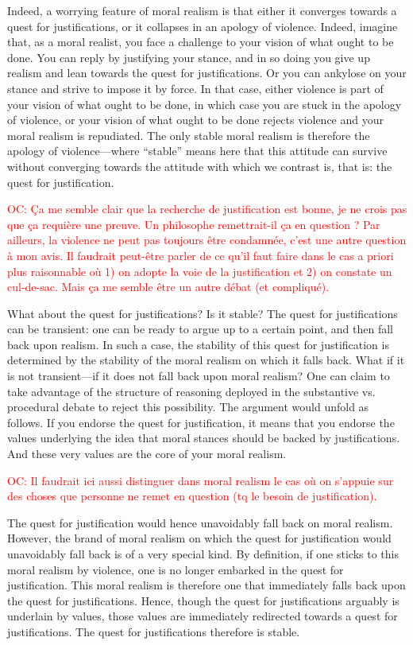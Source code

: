 \documentclass[preprint,11pt]{elsarticle}
\newcommand{\commentOC}[1]{\textcolor{red}{OC: #1}}
\begin{document}
Indeed, a worrying feature of moral realism is that either it converges towards a quest for justifications, or it collapses in an apology of violence. Indeed, imagine that, as a moral realist, you face a challenge to your vision of what ought to be done. You can reply by justifying your stance, and in so doing you give up realism and lean towards the quest for justifications. Or you can ankylose on your stance and strive to impose it by force. In that case, either violence is part of your vision of what ought to be done, in which case you are stuck in the apology of violence, or your vision of what ought to be done rejects violence and your moral realism is repudiated. The only stable moral realism is therefore the apology of violence—where “stable” means here that this attitude can survive without converging towards the attitude with which we contrast is, that is: the quest for justification.

\commentOC{ Ça me semble clair que la
recherche de justification est bonne, je ne crois pas que ça
requière une preuve. Un philosophe remettrait-il ça en
question ? Par ailleurs, la violence ne peut pas toujours être
condamnée, c’est une autre question à mon avis. Il faudrait
peut-être parler de ce qu’il faut faire dans le cas a priori plus
raisonnable où 1) on adopte la voie de la justification et 2)
on constate un cul-de-sac. Mais ça me semble être un autre
débat (et compliqué).}

What about the quest for justifications? Is it stable? The quest for justifications can be transient: one can be ready to argue up to a certain point, and then fall back upon realism. In such a case, the stability of this quest for justification is determined by the stability of the moral realism on which it falls back. What if it is not transient—if it does not fall back upon moral realism? One can claim to take advantage of the structure of reasoning deployed in the substantive vs. procedural debate to reject this possibility. The argument would unfold as follows. If you endorse the quest for justification, it means that you endorse the values underlying the idea that moral stances should be backed by justifications. And these very values are the core of your moral realism.

\commentOC{Il faudrait ici aussi distinguer
dans moral realism le cas où on s’appuie sur des choses que
personne ne remet en question (tq le besoin de
justification).}

 The quest for justification would hence unavoidably fall back on moral realism. However, the brand of moral realism on which the quest for justification would unavoidably fall back is of a very special kind. By definition, if one sticks to this moral realism by violence, one is no longer embarked in the quest for justification. This moral realism is therefore one that immediately falls back upon the quest for justifications. Hence, though the quest for justifications arguably is underlain by values, those values are immediately redirected towards a quest for justifications. The quest for justifications therefore is stable.
\end{document}
